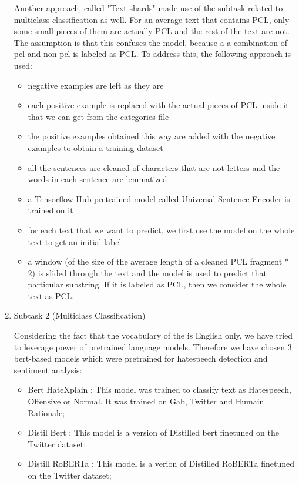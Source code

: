 \documentclass[11pt]{article}
\begin{document}
\begin{enumerate}
Another approach, called "Text shards" made use of the subtask related to
multiclass classification as well. For an average text that contains PCL,
only some small pieces of them are actually PCL and the rest of the text are
not. The assumption is that this confuses the model, because a a combination
of pcl and non pcl is labeled as PCL. To address this, the following
approach is used:

\begin{itemize}
\item negative examples are left as they are

\item each positive example is replaced with the actual pieces of PCL inside
it that we can get from the categories file

\item the positive examples obtained this way are added with the negative
examples to obtain a training dataset

\item all the sentences are cleaned of characters that are not letters and
the words in each sentence are lemmatized

\item a Tensorflow Hub pretrained model called Universal Sentence Encoder is
trained on it

\item for each text that we want to predict, we first use the model on the
whole text to get an initial label

\item a window (of the size of the average length of a cleaned PCL fragment
* 2) is slided through the text and the model is used to predict that
particular substring. If it is labeled as PCL, then we consider the whole
text as PCL.
\end{itemize}

\item Subtask 2 (Multiclass Classification)

Considering the fact that the vocabulary of the is English only, we have tried
to leverage power of pretrained language models. Therefore we have chosen 3
bert-based models which were pretrained for hatespeech detection and sentiment analysis:

\begin{itemize}

    \item Bert HateXplain \cite{mathew2020hatexplain}: This model was trained to classify text as Hatespeech, Offensive or Normal.
        It was trained on Gab, Twitter and Humain Rationale;
    \item Distil Bert \cite{?}: This model is a version of Distilled bert finetuned on the Twitter dataset;
    \item Distill RoBERTa \cite{?}: This model is a verion of Distilled RoBERTa finetuned on the Twitter dataset;

\end{itemize}


\end{enumerate}
\end{document}
